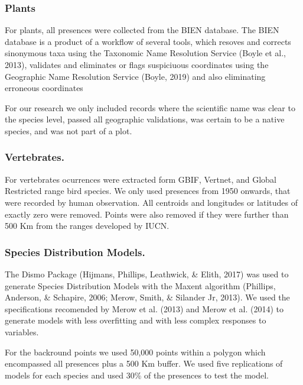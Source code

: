 \documentclass[]{article}
\begin{document}
\hypertarget{plants}{%
\subsubsection{Plants}\label{plants}}

For plants, all presences were collected from the BIEN database. The BIEN database is a product of a workflow of several tools, which resoves and corrects sinonymous taxa using the Taxonomic Name Resolution Service (Boyle et al., 2013), validates and eliminates or flags suspiciuous coordinates using the Geographic Name Resolution Service (Boyle, 2019) and also eliminating erroneous coordinates

For our research we only included records where the scientific name was clear to the species level, passed all geographic validations, was certain to be a native species, and was not part of a plot.

\hypertarget{vertebrates.}{%
\subsubsection{Vertebrates.}\label{vertebrates.}}

For vertebrates ocurrences were extracted form GBIF, Vertnet, and Global Restricted range bird species. We only used presences from 1950 onwards, that were recorded by human observation. All centroids and longitudes or latitudes of exactly zero were removed. Points were also removed if they were further than 500 Km from the ranges developed by IUCN.

\hypertarget{species-distribution-models.}{%
\subsubsection{Species Distribution Models.}\label{species-distribution-models.}}

The Dismo Package (Hijmans, Phillips, Leathwick, \& Elith, 2017) was used to generate Species Distribution Models with the Maxent algorithm (Phillips, Anderson, \& Schapire, 2006; Merow, Smith, \& Silander Jr, 2013). We used the specifications recomended by Merow et al. (2013) and Merow et al. (2014) to generate models with less overfitting and with less complex responses to variables.

For the backround points we used 50,000 points within a polygon which encompassed all presences plus a 500 Km buffer. We used five replications of models for each species and used 30\% of the presences to test the model.
\end{document}
